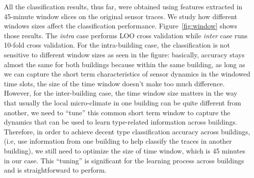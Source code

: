 All the classification results, thus far, were obtained using features extracted in 45-minute window slices on the original sensor traces. We study how different windows sizes affect the classification performance. Figure~\ref{fig:window} shows those results. The \emph{intra} case performs LOO cross validation while \emph{inter}
case runs 10-fold cross validation. For the intra-building case, the classification is not sensitive to different window sizes as seen in the figure: basically, accuracy stays almost the same 
for both buildings because within the same building, as long as we can capture the short term characteristics of sensor dynamics in the windowed time slots, the size of the time window 
doesn't make too much difference. However, for the inter-building case, the time window size matters in the way that usually the local micro-climate in one building can be quite different 
from another, we need to ``tune'' this common short term window to capture the dynamics that can be used to learn type-related information across buildings. Therefore, in order to achieve 
decent type classification accuracy across buildings, (i.e, use information from one building to help classify the traces in another building), we still need to optimize the size of time window, 
which is 45 minutes in our case. This ``tuning'' is significant for the learning process across buildings and is straightforward to perform.

